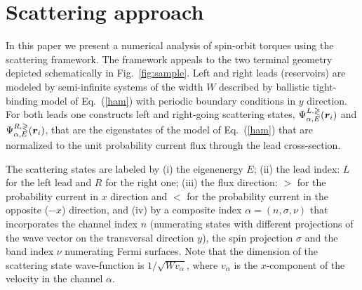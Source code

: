\section{Scattering approach}

In this paper we present a numerical analysis of spin-orbit torques using the scattering framework. The framework appeals to the two terminal geometry depicted schematically in Fig.~\ref{fig:sample}. Left and right leads (reservoirs) are modeled by semi-infinite systems of the width $W$ described by ballistic tight-binding model of Eq.~(\ref{ham}) with periodic boundary conditions in $y$ direction. For both leads one constructs left and right-going scattering states, $\Psi^{L,\gtrless}_{\alpha,E}(\boldsymbol{r}_i)$ and $\Psi^{R,\gtrless}_{\alpha,E}(\boldsymbol{r}_i)$, that are the eigenstates of the model of Eq.~(\ref{ham}) that are normalized to the unit probability current flux through the lead cross-section. 

The scattering states are labeled by (i) the eigenenergy $E$; (ii) the lead index: $L$ for the left lead and $R$ for the right one; (iii) the flux direction: $>$ for the probability current in $x$ direction and $<$ for the probability current in the opposite ($-x$)  direction, and (iv) by a composite index $\alpha=(n,\sigma,\nu)$ that incorporates the channel index $n$ (numerating states with different projections of the wave vector on the transversal direction $y$), the spin projection $\sigma$ and the band index $\nu$ numerating Fermi surfaces. Note that the dimension of the scattering state wave-function is $1/\sqrt{Wv_\alpha}$, where $v_\alpha$ is the $x$-component of the velocity in the channel $\alpha$.  

